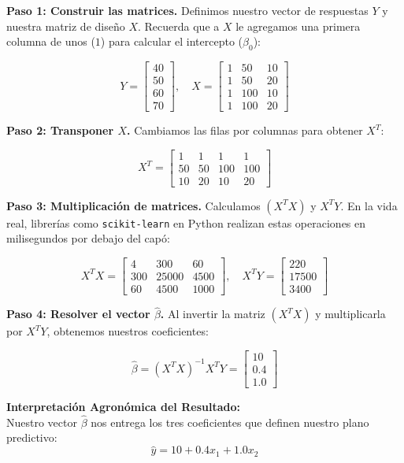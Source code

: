 \documentclass{article}
\begin{document}
\textbf{Paso 1: Construir las matrices.} 
Definimos nuestro vector de respuestas $Y$ y nuestra matriz de diseño $X$. Recuerda que a $X$ le agregamos una primera columna de unos ($1$) para calcular el intercepto ($\beta_0$):

$$
Y = \begin{bmatrix} 40 \\ 50 \\ 60 \\ 70 \end{bmatrix}, \quad
X = \begin{bmatrix} 1 & 50 & 10 \\ 1 & 50 & 20 \\ 1 & 100 & 10 \\ 1 & 100 & 20 \end{bmatrix}
$$

\textbf{Paso 2: Transponer $X$.} 
Cambiamos las filas por columnas para obtener $X^T$:

$$
X^T = \begin{bmatrix} 1 & 1 & 1 & 1 \\ 50 & 50 & 100 & 100 \\ 10 & 20 & 10 & 20 \end{bmatrix}
$$

\textbf{Paso 3: Multiplicación de matrices.} 
Calculamos $(X^T X)$ y $X^T Y$. En la vida real, librerías como \texttt{scikit-learn} en Python realizan estas operaciones en milisegundos por debajo del capó:

$$
X^T X = \begin{bmatrix} 4 & 300 & 60 \\ 300 & 25000 & 4500 \\ 60 & 4500 & 1000 \end{bmatrix}, \quad
X^T Y = \begin{bmatrix} 220 \\ 17500 \\ 3400 \end{bmatrix}
$$

\textbf{Paso 4: Resolver el vector $\hat{\beta}$.} 
Al invertir la matriz $(X^T X)$ y multiplicarla por $X^T Y$, obtenemos nuestros coeficientes:

$$
\hat{\beta} = (X^T X)^{-1} X^T Y = \begin{bmatrix} 10 \\ 0.4 \\ 1.0 \end{bmatrix}
$$

\textbf{Interpretación Agronómica del Resultado:} \\
Nuestro vector $\hat{\beta}$ nos entrega los tres coeficientes que definen nuestro plano predictivo:
$$ \hat{y} = 10 + 0.4x_1 + 1.0x_2 $$
\end{document}
